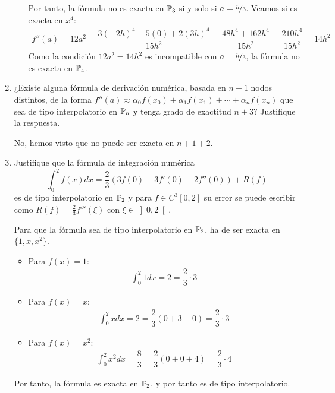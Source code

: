 \begin{ejercicio}
\begin{enumerate}
\begin{enumerate}
            Por tanto, la fórmula no es exacta en $\mathbb{P}_3$ si y solo si $a=\nicefrac{h}{3}$. Veamos si es exacta en $x^4$:
            \begin{align*}
                f''(a) = 12a^2 = \dfrac{3(-2h)^4 - 5(0) + 2(3h)^4}{15h^2} = \dfrac{48h^4 + 162h^4}{15h^2} = \dfrac{210h^4}{15h^2} = 14h^2
            \end{align*}
            Como la condición $12a^2=14h^2$ es incompatible con $a=\nicefrac{h}{3}$, la fórmula no es exacta en $\mathbb{P}_4$.
        \end{enumerate}
        \item ¿Existe alguna fórmula de derivación numérica, basada en $n + 1$ nodos distintos, de la forma $f''(a) \approx \alpha_0 f(x_0) + \alpha_1 f(x_1) + \cdots + \alpha_n f(x_n)$ que sea de tipo interpolatorio en $\mathbb{P}_n$ y tenga grado de exactitud $n + 3$? Justifique la respuesta.
        
        No, hemos visto que no puede ser exacta en $n+1+2$.
        \item Justifique que la fórmula de integración numérica $$\int_{0}^{2} f(x) dx = \frac{2}{3} (3f(0) + 3f'(0) + 2f''(0)) + R(f)$$ es de tipo interpolatorio en $\mathbb{P}_2$ y para $f \in C^3[0, 2]$ su error se puede escribir como $R(f) = \frac{2}{3} f'''(\xi)$ con $\xi \in \left]0,2\right[$.
        
        Para que la fórmula sea de tipo interpolatorio en $\mathbb{P}_2$, ha de ser exacta en $\{1,x,x^2\}$.
        \begin{itemize}
            \item Para $f(x) = 1$:
            \begin{align*}
                \int_{0}^{2} 1 dx = 2 = \dfrac{2}{3}\cdot 3
            \end{align*}
            \item Para $f(x) = x$:
            \begin{align*}
                \int_{0}^{2} x dx = 2 = \dfrac{2}{3}\left(0+3+0\right) = \dfrac{2}{3}\cdot 3
            \end{align*}
            \item Para $f(x) = x^2$:
            \begin{align*}
                \int_{0}^{2} x^2 dx = \dfrac{8}{3} = \dfrac{2}{3}\left(0+0+4\right) = \dfrac{2}{3}\cdot 4
            \end{align*}
        \end{itemize}
        Por tanto, la fórmula es exacta en $\mathbb{P}_2$, y por tanto es de tipo interpolatorio.


\end{enumerate}
\end{ejercicio}
